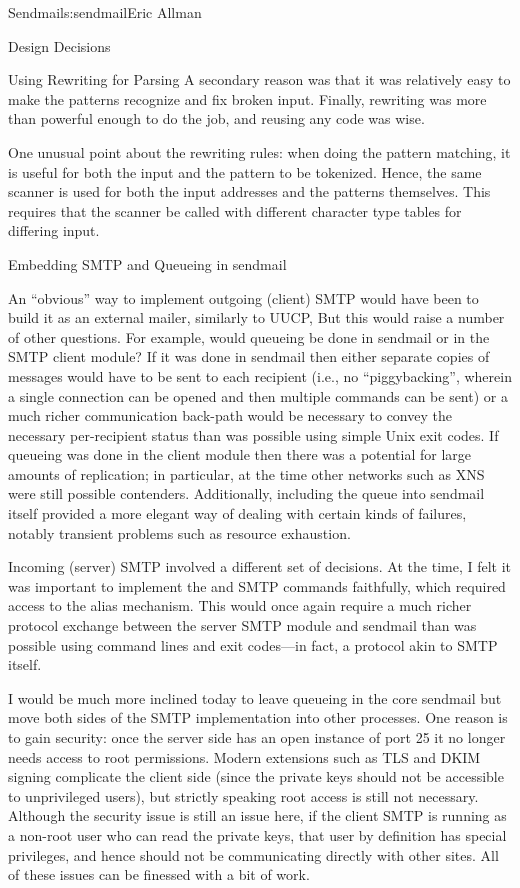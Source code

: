 \begin{aosachapter}{Sendmail}{s:sendmail}{Eric Allman}
\begin{aosasect1}{Design Decisions}
\begin{aosasect2}{Using Rewriting for Parsing}
A secondary reason was that it was relatively easy to make the
patterns recognize and fix broken input. Finally, rewriting was more
than powerful enough to do the job, and reusing any code was wise.

One unusual point about the rewriting rules: when doing the pattern
matching, it is useful for both the input and the pattern to be
tokenized. Hence, the same scanner is used for both the input
addresses and the patterns themselves. This requires that the scanner
be called with different character type tables for differing input.

\end{aosasect2}

\begin{aosasect2}{Embedding SMTP and Queueing in sendmail}

An ``obvious'' way to implement outgoing (client) SMTP would have been
to build it as an external mailer, similarly to UUCP,  But this would
raise a number of other questions. For example, would queueing be done
in sendmail or in the SMTP client module? If it was done in sendmail
then either separate copies of messages would have to be sent to each
recipient (i.e., no ``piggybacking'', wherein a single connection can
be opened and then multiple  commands can be sent) or a much
richer communication back-path would be necessary to convey the
necessary per-recipient status than was possible using simple Unix
exit codes. If queueing was done in the client module then there was a
potential for large amounts of replication; in particular, at the time
other networks such as XNS were still possible
contenders. Additionally, including the queue into sendmail itself
provided a more elegant way of dealing with certain kinds of failures,
notably transient problems such as resource exhaustion.

Incoming (server) SMTP involved a different set of decisions. At the
time, I felt it was important to implement the  and
 SMTP commands faithfully, which required access to the
alias mechanism.  This would once again require a much richer protocol
exchange between the server SMTP module and sendmail than was possible
using command lines and exit codes---in fact, a protocol akin to SMTP
itself.

I would be much more inclined today to leave queueing in the core
sendmail but move both sides of the SMTP implementation into other
processes. One reason is to gain security: once the server side has an
open instance of port 25 it no longer needs access to root
permissions. Modern extensions such as TLS and DKIM signing complicate
the client side (since the private keys should not be accessible to
unprivileged users), but strictly speaking root access is still not
necessary. Although the security issue is still an issue here, if the
client SMTP is running as a non-root user who can read the private
keys, that user by definition has special privileges, and hence should
not be communicating directly with other sites. All of these issues
can be finessed with a bit of work.


\end{aosasect2}
\end{aosasect1}
\end{aosachapter}
